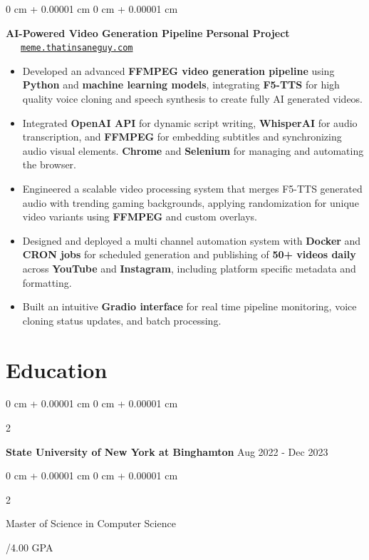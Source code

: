 \documentclass[10pt, letterpaper]{article}
\newenvironment{highlights}{
    \begin{itemize}[
        topsep=0.10 cm,
        parsep=0.10 cm,
        partopsep=0pt,
        itemsep=0pt,
        leftmargin=0 cm + 10pt
    ]
}{
    \end{itemize}
} %
\newenvironment{onecolentry}{
    \begin{adjustwidth}{
        0 cm + 0.00001 cm
    }{
        0 cm + 0.00001 cm
    }
}{
    \end{adjustwidth}
} %
\newenvironment{twocolentry}[2][]{
    \onecolentry
    \def\secondColumn{#2}
    \setcolumnwidth{\fill, 4.5 cm}
    \begin{paracol}{2}
}{
    \switchcolumn \raggedleft \secondColumn
    \end{paracol}
    \endonecolentry
} %
\begin{document}
\begin{onecolentry}
	\textbf{AI-Powered Video Generation Pipeline} \hfill \textbf{Personal Project} \ \ \ \href{http://meme.thatinsaneguy.com/}{\texttt{meme.thatinsaneguy.com}}
	\begin{highlights}
		\item Developed an advanced \textbf{FFMPEG video generation pipeline} using \textbf{Python} and \textbf{machine learning models}, integrating \textbf{F5-TTS} for high quality voice cloning and speech synthesis to create fully AI generated videos.
		\item Integrated \textbf{OpenAI API} for dynamic script writing, \textbf{WhisperAI} for audio transcription, and \textbf{FFMPEG} for embedding subtitles and synchronizing audio visual elements. \textbf{Chrome} and \textbf{Selenium} for managing and automating the browser.
		\item Engineered a scalable video processing system that merges F5-TTS generated audio with trending gaming backgrounds, applying randomization for unique video variants using \textbf{FFMPEG} and custom overlays.
		\item Designed and deployed a multi channel automation system with \textbf{Docker} and \textbf{CRON jobs} for scheduled generation and publishing of \textbf{50+ videos daily} across \textbf{YouTube} and \textbf{Instagram}, including platform specific metadata and formatting.
		\item Built an intuitive \textbf{Gradio interface} for  real time pipeline monitoring, voice cloning status updates, and batch processing.
	\end{highlights}
\end{onecolentry}




\section{Education}
\begin{twocolentry}{
		Aug 2022 - Dec 2023
	}
	\textbf{State University of New York at Binghamton}\end{twocolentry}

\begin{twocolentry}{
		3.44/4.00 GPA
	}
	Master of Science in Computer Science
\end{twocolentry}


\vspace{0.2 cm}
\end{document}
